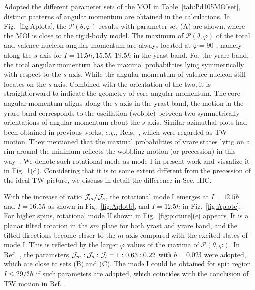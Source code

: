 \documentclass[aps,prc,preprint,showpacs,groupedaddress,floatfix,amsmath,amssymb]{revtex4-1}
\begin{document}
Adopted the different parameter sets of the MOI in Table~\ref{tab:Pd105MOIset}, distinct patterns of angular momentum are obtained in the calculations.
In Fig.~\ref{fig:Aplota}, the $\mathcal{P}(\theta, \varphi)$ results with parameter set (A) are shown, where the MOI is close to the rigid-body model. The maximum of $\mathcal{P}(\theta, \varphi)$ of the total and valence nucleon angular momentum are always located at $\varphi=90^{\circ}$, namely along the $s$ axis for $I=11.5\hbar, 15.5\hbar, 19.5\hbar$ in the yrast band.
For the yrare band, the total angular momentum has the maximal probabilities lying symmetrically with respect to the $s$ axis. While the angular momentum of valence nucleon still locates on the $s$ axis.
Combined with the orientation of the two,
it is straightforward to indicate the geometry of core angular momentum.
The core angular momentum aligns along the $s$ axis in the yrast band,
the motion in the yrare band corresponds to the oscillation (wobble) between two symmetrically orientations of angular
momentum about the $s$ axis.
Similar azimuthal plots  had been obtained in previous works, $e.g.$, Refs.~\cite{CQB19,Streck18,Ba130}, which were regarded as TW motion. They mentioned that the maximal probabilities of yrare states lying on a rim around the minimum reflects the wobbling motion (or precession) in this way~\cite{CQB19,Ba130}.  We denote such rotational mode as mode I in present work and visualize it in Fig.~1(d). Considering that it is to some extent different from the precession of the ideal TW picture, we discuss in detail the difference in Sec. IIIC.


With the increase of ratio ${\cal J}_m/{\cal J}_s$, the rotational mode I emerges at  $I=12.5\hbar$ and $I=16.5\hbar$ as shown in Fig.~\ref{fig:Aplotb}, and  $I=12.5\hbar$  in Fig.~\ref{fig:Aplotc}. For higher spins, rotational mode II shown in Fig.~\ref{fig:picture}(e) appears. It is a planar tilted rotation in the $sm$ plane for both yrast and yrare band, and
the tilted directions become closer to the $m$ axis compared with the excited states of mode I. This is reflected by the larger $\varphi$ values of the maxima of $\mathcal{P}(\theta, \varphi)$.
In Ref.~\cite{Pd105}, the parameters ${\cal J}_{m}:{\cal J}_{s}:{\cal J}_{l}=1:0.63:0.22$ with $b=0.023$ were adopted, which are close to sets (B) and (C). The mode I
could be obtained for spin region $I\leq 29/2\hbar$ if such parameters are adopted,  which coincides with the conclusion of TW motion in Ref.~\cite{Pd105}.
\end{document}
